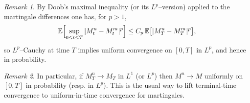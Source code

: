 \documentclass[11pt]{article}
\theoremstyle{definition}
\theoremstyle{remark}
\newtheorem{remark}{Remark}
\begin{document}
\begin{remark}
By Doob's maximal inequality (or its $L^p$--version) applied to the martingale differences one has, for $p>1$,
\[
\mathbb{E}\Bigl[\sup_{0\le t\le T}|M_t^n - M_t^m|^p\Bigr]
\le C_p\,\mathbb{E}\bigl[|M_T^n - M_T^m|^p\bigr],
\]
so $L^p$--Cauchy at time $T$ implies uniform convergence on $[0,T]$ in $L^p$, and hence in probability.
\end{remark}

\begin{remark}
In particular, if $M_T^n\to M_T$ in $L^1$ (or $L^p$) then $M^n\to M$ uniformly on $[0,T]$ in probability (resp. in $L^p$). This is the usual way to lift terminal-time convergence to uniform-in-time convergence for martingales.
\end{remark}
\end{document}
